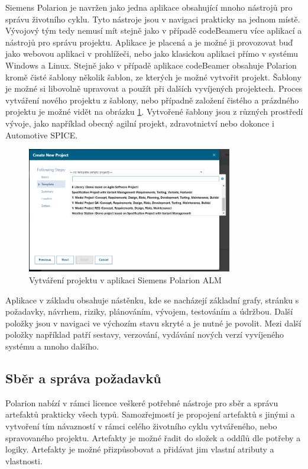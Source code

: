 \documentclass[czech,master]{diploma}
\begin{document}
Siemens Polarion je navržen jako jedna aplikace obsahující mnoho nástrojů pro správu životního cyklu. Tyto nástroje jsou v navigaci prakticky na jednom místě. Vývojový tým tedy nemusí mít stejně jako v případě codeBeameru více aplikací a nástrojů pro správu projektu. Aplikace je placená a je možné ji provozovat buď jako webovou aplikaci v prohlížeči, nebo jako klasickou aplikaci přímo v systému Windows a Linux. Stejně jako v případě aplikace codeBeamer obsahuje Polarion kromě čisté šablony několik šablon, ze kterých je možné vytvořit projekt. Šablony je možné si libovolně upravovat a použít při dalších vyvíjených projektech. Proces vytváření nového projektu z šablony, nebo případně založení čistého a prázdného projektu je možné vidět na obrázku \ref{fig:polarion_new_project}. Vytvořené šablony jsou z různých prostředí vývoje, jako například obecný agilní projekt, zdravotnictví nebo dokonce i Automotive SPICE.


\begin{figure}[!ht]
    \centering
    \includegraphics[width=0.8\textwidth]{Diplomka/Figures/polarion_create_project.png}
    \caption{Vytváření projektu v aplikaci Siemens Polarion ALM}
    \label{fig:polarion_new_project}
\end{figure}


Aplikace v základu obsahuje nástěnku, kde se nacházejí základní grafy, stránku s požadavky, návrhem, riziky, plánováním, vývojem, testováním a údržbou. Další položky jsou v navigaci ve výchozím stavu skryté a je nutné je povolit. Mezi další položky například patří sestavy, verzování, vydávání nových verzí vyvíjeného systému a mnoho dalšího.

\subsection{Sběr a správa požadavků}
Polarion nabízí v rámci licence veškeré potřebné nástroje pro sběr a správu artefaktů prakticky všech typů. Samozřejmostí je propojení artefaktů s jinými a vytvoření tím návazností v rámci celého životního cyklu vytvářeného, nebo spravovaného projektu. Artefakty je možné řadit do složek a oddílů dle potřeby a logiky. Artefakty je možné přizpůsobovat a přidávat jim vlastní atributy a vlastnosti.
\end{document}
